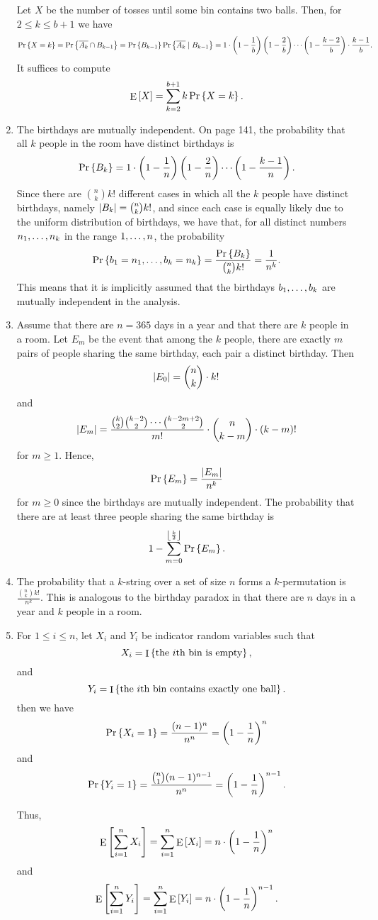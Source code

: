 \begin{enumerate}[\thesection-1]
Let $X$ be the number of tosses until some bin contains two balls. Then, for $2 \leq k \leq b + 1$ we have
\[
\Pr\left\{X = k\right\} = \Pr\left\{\overline{A_k} \cap B_{k - 1}\right\} = \Pr\left\{B_{k - 1}\right\} \Pr\left\{\overline{A_k} \mid B_{k - 1}\right\} = 1 \cdot \left(1 - \frac{1}{b}\right) \left(1 - \frac{2}{b}\right) \cdots \left(1 - \frac{k - 2}{b}\right) \cdot \frac{k - 1}{b}.
\]
It suffices to compute
\[
\mathop{\mathrm{E}}\left[X\right] = \sum^{b + 1}_{k = 2} k \Pr\left\{X = k\right\}.
\]
%
\item The birthdays are mutually independent. On page 141, the probability that all $k$ people in the room have distinct birthdays is
\[
\Pr\left\{B_k\right\} = 1 \cdot \left(1 - \frac{1}{n}\right) \left(1 - \frac{2}{n}\right) \cdots \left(1 - \frac{k - 1}{n}\right).
\]
Since there are ${n \choose k} k!$ different cases in which all the $k$ people have distinct birthdays, namely $\left|B_k\right| = {n \choose k} k!$, and since each case is equally likely due to the uniform distribution of birthdays, we have that, for all distinct numbers $n_1, \ldots, n_k$ in the range $1, \ldots, n$, the probability
\[
\Pr\left\{b_1 = n_1, \ldots, b_k = n_k\right\} = \frac{\Pr\left\{B_k\right\}}{{n \choose k} k!} = \frac{1}{n^k}.
\]
This means that it is implicitly assumed that the birthdays $b_1, \ldots, b_k$ are mutually independent in the analysis.
%
\item Assume that there are $n = 365$ days in a year and that there are $k$ people in a room. Let $E_m$ be the event that among the $k$ people, there are exactly $m$ pairs of people sharing the same birthday, each pair a distinct birthday. Then
\[
\left|E_0\right| = {n \choose k} \cdot k!
\]
and
\[
\left|E_m\right| = \frac{{k \choose 2}{k - 2 \choose 2} \cdots {k - 2m + 2 \choose 2}}{m!} \cdot {n \choose k - m} \cdot (k - m)!
\]
for $m \geq 1$. Hence,
\[
\Pr\left\{E_m\right\} = \frac{\left|E_m\right|}{n^k}
\]
for $m \geq 0$ since the birthdays are mutually independent. The probability that there are at least three people sharing the same birthday is
\[
1 - \sum^{\left\lfloor \frac{k}{2} \right\rfloor}_{m = 0} \Pr\left\{E_m\right\}.
\]
%
\item The probability that a $k$-string over a set of size $n$ forms a $k$-permutation is $\frac{{n \choose k} k!}{n^k}$. This is analogous to the birthday paradox in that there are $n$ days in a year and $k$ people in a room.
%
\item For $1 \leq i \leq n$, let $X_i$ and $Y_i$ be indicator random variables such that
\[
X_i = \ind{\mbox{the \mathmode{i}th bin is empty}},
\]
and
\[
Y_i = \ind{\mbox{the \mathmode{i}th bin contains exactly one ball}}.
\]
then we have
\[
\Pr\left\{X_i = 1\right\} = \frac{(n - 1)^n}{n^n} = \left(1 - \frac{1}{n}\right)^n
\]
and
\[
\Pr\left\{Y_i = 1\right\} = \frac{{n \choose 1}(n - 1)^{n - 1}}{n^n} = \left(1 - \frac{1}{n}\right)^{n - 1}.
\]

Thus,
\[
\mathop{\mathrm{E}}\left[\sum^n_{i = 1} X_i\right] = \sum^n_{i = 1} \mathop{\mathrm{E}}\left[X_i\right] = n \cdot \left(1 - \frac{1}{n}\right)^n
\]
and
\[
\mathop{\mathrm{E}}\left[\sum^n_{i = 1} Y_i\right] = \sum^n_{i = 1} \mathop{\mathrm{E}}\left[Y_i\right] = n \cdot \left(1 - \frac{1}{n}\right)^{n - 1}.
\]
%
\end{enumerate}

%
%

